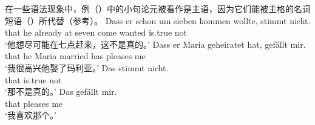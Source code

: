 \noindent
在一些语法现象中，例（）中的小句论元被看作是主语，因为它们能被主格的名词短语（）所代替（参考\eg \citealp[, 289]{Eisenberg2004a}）。
\eal
\ex
\gll Dass er schon um sieben kommen wollte, stimmt nicht.\\
	 that he already at seven come wanted is.true not\\
\glt `他想尽可能在七点赶来，这不是真的。'
\ex 
\gll Dass er Maria geheiratet hat, gefällt mir.\\
	 that he Maria married has pleases me\\
\glt `我很高兴他娶了玛利亚。'
\zl
\eal
\ex
\gll Das stimmt nicht.\\
	 that is.true not\\
\glt `那不是真的。'
\ex 
\gll Das gefällt mir.\\
	 that pleases me\\
\glt `我喜欢那个。'
\zl
